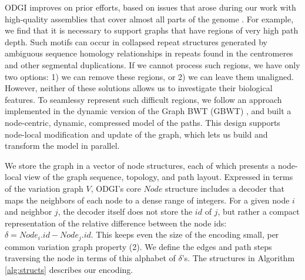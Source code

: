 \documentclass{bioinfo}
\begin{document}
ODGI improves on prior efforts, based on issues that arose during our work with high-quality assemblies that cover almost all parts of the genome \citep{Logsdon_2021,Nurk_2021}.
For example, we find that it is necessary to support graphs that have regions of very high path depth.
Such motifs can occur in collapsed repeat structures generated by ambiguous sequence homology relationships in repeats found in the centromeres and other segmental duplications.
If we cannot process such regions, we have only two options: 1) we can remove these regions, or 2) we can leave them unaligned. However, neither of these solutions allows us to investigate their biological features.
To seamlessy represent such difficult regions, we follow an approach implemented in the dynamic version of the Graph BWT (GBWT) \citep{Siren:2020}, and built a node-centric, dynamic, compressed model of the paths.
This design supports node-local modification and update of the graph, which lets us build and transform the model in parallel.

We store the graph in a vector of node structures, each of which presents a node-local view of the graph sequence, topology, and path layout.
Expressed in terms of the variation graph $V$, ODGI's core $Node$ structure includes a decoder that maps the neighbors of each node to a dense range of integers.
For a given node $i$ and neighbor $j$, the decoder itself does not store the $id$ of $j$, but rather a compact representation of the relative difference between the node ids: $\delta = Node_i.id - Node_j.id$.
This keeps even the size of the encoding small, per common variation graph property (2).
We define the edges and path steps traversing the node in terms of this alphabet of $\delta$'s.
The structures in Algorithm \ref{alg:structs} describes our encoding.
\end{document}
